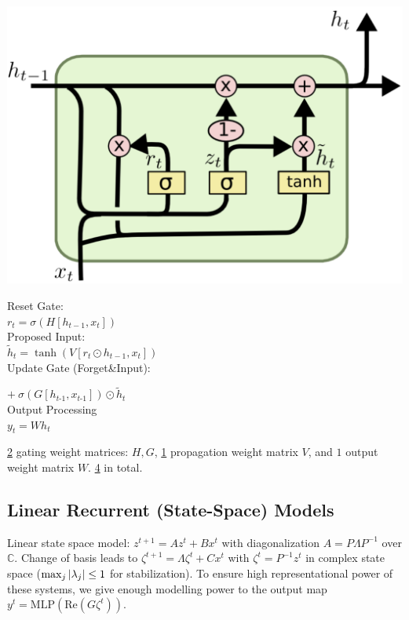 \begin{minipage}{0.5\linewidth}
\includegraphics[width=\linewidth]{gru.png}
\end{minipage}
\begin{minipage}{0.5\linewidth}
Reset Gate:\\
$r_t = \sigma(H [h_{t-1}, x_t])$\\[-2pt]

Proposed Input:\\
$\tilde{h}_t = \tanh(V[r_t \odot h_{t-1}, x_t])$\\[-2pt]

Update Gate (Forget\&Input):\\

\hspace{7pt} $+\ \sigma(G[h_{t\text{-}1}, x_{t\text{-}1}]) \odot \tilde h_t$\\[-2pt]

Output Processing\\ $y_t = W h_t$
\end{minipage}
\underline{2} gating weight matrices: $H, G$, \underline{1} propagation weight matrix $V$, and $1$ output weight matrix $W$. \underline{4} in total.

\subsection*{Linear Recurrent (State-Space) Models}
Linear state space model: $z^{t+1}=Az^t+Bx^t$ with diagonalization $A=P\Lambda P^{-1}$ over $\mathbb{C}$. Change of basis leads to $\zeta^{t+1}=\Lambda\zeta^t+Cx^t$ with $\zeta^t=P^{-1}z^t$ in complex state space ($\max_j\abs{\lambda_j}\leq 1$ for stabilization). To ensure high representational power of these systems, we give enough modelling power to the output map $y^t=\text{MLP}(\text{Re}(G\zeta^t))$.

